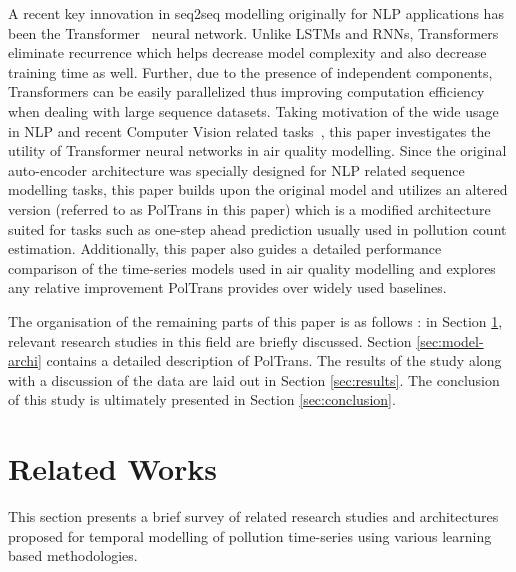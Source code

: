 \documentclass[10pt,journal]{IEEEtran}
\begin{document}
A recent key innovation in seq2seq modelling originally for NLP applications has been the Transformer~\cite{Vaswani.2017} neural network. Unlike LSTMs and RNNs, Transformers eliminate recurrence which helps decrease model complexity and also decrease training time as well. Further, due to the presence of independent components, Transformers can be easily parallelized thus improving computation efficiency when dealing with large sequence datasets. Taking motivation of the wide usage in NLP and recent Computer Vision related tasks~\cite{Parmer.2018}, this paper investigates the utility of Transformer neural networks in air quality modelling. Since the original auto-encoder architecture was specially designed for NLP related sequence modelling tasks, this paper builds upon the original model and utilizes an altered version (referred to as {PolTrans} in this paper) which is a modified architecture suited for tasks such as one-step ahead prediction usually used in pollution count estimation. Additionally, this paper also guides a detailed performance comparison of the time-series models used in air quality modelling and explores any relative improvement {PolTrans} provides over widely used baselines.

The organisation of the remaining parts of this paper is as follows : in Section \ref{sec:related-works}, relevant research studies in this field are briefly discussed. Section \ref{sec:model-archi} contains a detailed description of {PolTrans}. The results of the study along with a discussion of the data are laid out in Section \ref{sec:results}. The conclusion of this study is ultimately presented in Section \ref{sec:conclusion}.

\section{Related Works}
\label{sec:related-works}

This section presents a brief survey of related research studies and architectures proposed for temporal modelling of pollution time-series using various learning based methodologies.
\end{document}
